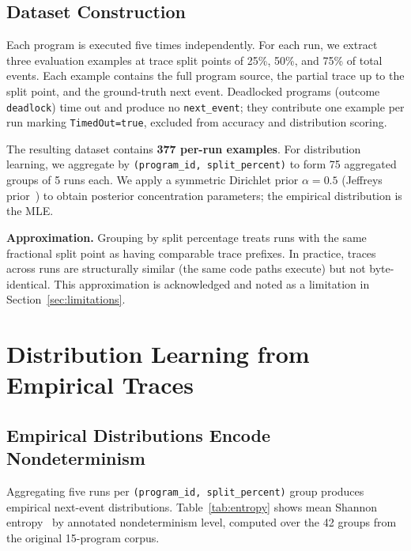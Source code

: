 \documentclass[sigconf,review,anonymous]{acmart}
\begin{document}
\subsection{Dataset Construction}

Each program is executed five times independently. For each run, we extract three
evaluation examples at trace split points of 25\%, 50\%, and 75\% of total events.
Each example contains the full program source, the partial trace up to the split
point, and the ground-truth next event. Deadlocked programs (outcome \texttt{deadlock})
time out and produce no \texttt{next\_event}; they contribute one example per run
marking \texttt{TimedOut=true}, excluded from accuracy and distribution scoring.

The resulting dataset contains \textbf{377 per-run examples}. For distribution
learning, we aggregate by \texttt{(program\_id, split\_percent)} to form 75
aggregated groups of 5 runs each. We apply a symmetric Dirichlet prior
$\alpha{=}0.5$ (Jeffreys prior~\cite{jeffreys1946}) to obtain posterior
concentration parameters; the empirical distribution is the MLE.

\textbf{Approximation.} Grouping by split percentage treats runs with the same
fractional split point as having comparable trace prefixes. In practice, traces
across runs are structurally similar (the same code paths execute) but not
byte-identical. This approximation is acknowledged and noted as a limitation in
Section~\ref{sec:limitations}.

\section{Distribution Learning from Empirical Traces}

\subsection{Empirical Distributions Encode Nondeterminism}

Aggregating five runs per \texttt{(program\_id, split\_percent)} group produces
empirical next-event distributions. Table~\ref{tab:entropy} shows mean Shannon
entropy~\cite{shannon1948} by annotated nondeterminism level, computed over the
42 groups from the original 15-program corpus.
\end{document}
